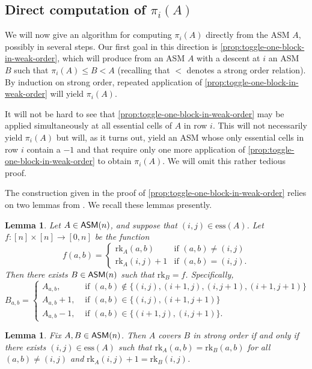 \documentclass[12 pt]{amsart}
\newtheorem{lemma}[Theorem]{Lemma}
\numberwithin{equation}{section}
\newcommand{\rk}{\mathrm{rk}}
\newcommand{\ess}{\mathrm{ess}}
\theoremstyle{remark}
\newcommand{\asm}{{\sf ASM}}
\begin{document}
\subsection{Direct computation of $\pi_i(A)$}
\label{sect:computing-pi_i(A)}
We will now give an algorithm for computing $\pi_i(A)$ directly from the ASM $A$, possibly in several steps.  Our first goal in this direction is \cref{prop:toggle-one-block-in-weak-order}, which will produce from an ASM $A$ with a descent at $i$ an ASM $B$ such that $\pi_i(A) \leq B<A$ (recalling that $<$ denotes a strong order relation). By induction on strong order, repeated application of \cref{prop:toggle-one-block-in-weak-order} will yield $\pi_i(A)$.  

It will not be hard to see that \cref{prop:toggle-one-block-in-weak-order} may be applied simultaneously at all essential cells of $A$ in row $i$.  This will not necessarily yield $\pi_i(A)$ but will, as it turns out, yield an ASM whose only essential cells in row $i$ contain a $-1$ and that require only one more application of \cref{prop:toggle-one-block-in-weak-order} to obtain $\pi_i(A)$.  We will omit this rather tedious proof.

The construction given in the proof of \cref{prop:toggle-one-block-in-weak-order} relies on two lemmas from \cite{EKW-main}.  We recall these lemmas presently.

\begin{lemma}{\cite[Lemma 2.17]{EKW-main}}\label{lemma:new-ASM-from-increasing-at-essential-cell}
    Let $A \in \asm(n)$, and suppose that $(i,j) \in \ess(A)$.  Let $f:[n] \times [n] \rightarrow [0,n]$ be the function 
\[f(a,b) = \begin{cases}
 \rk_A(a,b) & \text{if } (a,b) \neq (i,j)\\
 \rk_A(i,j)+1 & \text{if } (a,b) = (i,j).
\end{cases}\]
    Then there exists $B \in \asm(n)$ such that $\rk_B = f$.  Specifically, \[
B_{a,b} = \begin{cases}
A_{a,b}, &\text{ if } (a,b) \notin \{(i,j),(i+1,j),(i,j+1),(i+1,j+1)\} \\
A_{a,b}+1, &\text{ if } (a,b) \in \{(i,j), (i+1,j+1)\}\\
A_{a,b}-1, &\text{ if } (a,b) \in \{(i+1,j), (i,j+1)\}.
\end{cases}
    \]
\end{lemma}

\begin{lemma}{\cite[Lemma 2.19]{EKW-main}}\label{lem:cover-by-add-to-ess-cell}
    Fix $A,B\in \asm(n)$.  Then $A$ covers $B$ in strong order if and only if there exists $(i,j)\in\ess(A)$ such that $\rk_A(a,b)=\rk_B(a,b)$ for all $(a,b)\neq (i,j)$ and $\rk_A(i,j)+1=\rk_B(i,j)$.  
\end{lemma}
\end{document}

